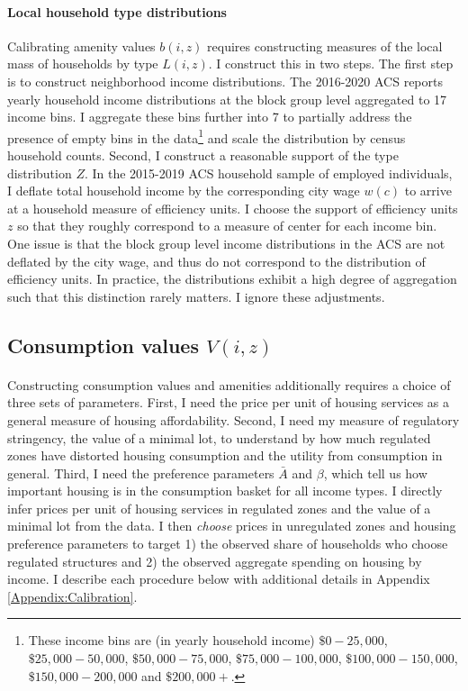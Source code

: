 \documentclass[11pt]{article}
\begin{document}
\paragraph*{Local household type distributions} Calibrating amenity values $b(i, z)$ requires constructing measures of the local mass of households by type $L(i, z)$. I construct this in two steps. The first step is to construct neighborhood income distributions. The 2016-2020 ACS reports yearly household income distributions at the block group level aggregated to 17 income bins. I aggregate these bins further into 7 to partially address the presence of empty bins in the data\footnote{These income bins are (in yearly household income) $\$0-25,000$, $\$25,000-50,000$, $\$50,000-75,000$, $\$75,000-100,000$, $\$100,000-150,000$, $\$150,000-200,000$ and $\$200,000+$.} and scale the distribution by census household counts. Second, I construct a reasonable support of the type distribution $Z$. In the 2015-2019 ACS household sample of employed individuals, I deflate total household income by the corresponding city wage $w(c)$ to arrive at a household measure of efficiency units. I choose the support of efficiency units $z$ so that they roughly correspond to a measure of center for each income bin. One issue is that the block group level income distributions in the ACS are not deflated by the city wage, and thus do not correspond to the distribution of efficiency units. In practice, the distributions exhibit a high degree of aggregation such that this distinction rarely matters. I ignore these adjustments.

\subsection{Consumption values $V(i, z)$} 
\paragraph*{}
Constructing consumption values and amenities additionally requires a choice of three sets of parameters. First, I need the price per unit of housing services as a general measure of housing affordability. Second, I need my measure of regulatory stringency, the value of a minimal lot, to understand by how much regulated zones have distorted housing consumption and the utility from consumption in general. Third, I need the preference parameters $\bar{A}$ and $\beta$, which tell us how important housing is in the consumption basket for all income types. I directly infer prices per unit of housing services in regulated zones and the value of a minimal lot from the data. I then \textit{choose} prices in unregulated zones and housing preference parameters to target 1) the observed share of households who choose regulated structures and 2) the observed aggregate spending on housing by income. I describe each procedure below with additional details in Appendix \ref{Appendix:Calibration}. 
\end{document}
